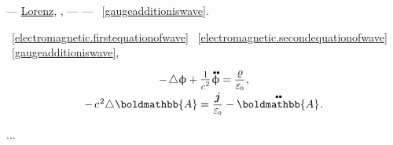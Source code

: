 \vspace{-0.2em}\noindent
--- \href{https://en.wikipedia.org/wiki/Lorenz_gauge_condition}{Lorenz},    , \:--- \href{https://en.wikipedia.org/wiki/Harmonic_function}{}\:--- ~\eqref{gaugeadditioniswave}.

~\eqref{electromagnetic.firstequationofwave} ~\eqref{electromagnetic.secondequationofwave} ~\eqref{gaugeadditioniswave},   

\nopagebreak\begin{equation}
\begin{array}{c}
- \hspace{-0.1ex} \Laplacian \upphi + \raisemath{.07em}{\scalebox{0.84}{$\displaystyle \frac{\raisemath{-0.16em}{1}}{\raisemath{-0.1em}c^{\hspace{.16ex}2}}$}} \hspace{.16ex} \mathdotdotabove{\upphi} = \smash{\displaystyle \frac{\chargedensity}{\raisemath{.16em}{\vacuumpermittivity}}}
\hspace{.1ex} ,
\\[.5em]
- \hspace{.3ex} c^{\hspace{.16ex}2} \hspace{-0.4ex} \Laplacian \hspace{.05ex} \boldmathbb{A} = \displaystyle \frac{\currentdensity}{\raisemath{.16em}{\vacuumpermittivity}} - \mathdotdotabove{\boldmathbb{A}}
\hspace{.2ex} .
\end{array}
\end{equation}

...



